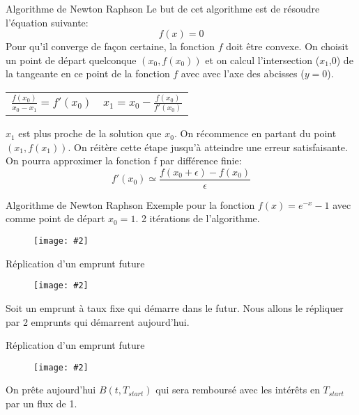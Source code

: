 \documentclass{beamer}
\newcommand{\FIG}[2]{\texttt{[image: \#2]}}
\begin{document}
\begin{frame}{Algorithme de Newton Raphson}
Le but de cet algorithme est de résoudre l'équation suivante:
\[
	f(x)=0
\]
Pour qu'il converge de façon certaine, la fonction $f$ doit être convexe.
On choisit un point de départ quelconque $(x_0,f(x_0))$ et on calcul l'intersection ($x_1$,0) de la tangeante en ce point de la fonction $f$ avec avec l'axe des abcisses ($y=0$).

\begin{center}
\begin{tabular}{c c}
$\frac{f(x_0)}{x_0-x_1}=f'(x_0)$
&
$x_1=x_0-\frac{f(x_0)}{f'(x_0)}$
\end{tabular}
\end{center}

$x_1$ est plus proche de la solution que $x_0$. On récommence en partant du point $(x_1,f(x_1))$. On réitère cette étape jusqu'à atteindre une erreur satisfaisante.\\
On pourra approximer la fonction f par différence finie:
\[
f'(x_0) \simeq \frac{f(x_0+\epsilon)-f(x_0)}{\epsilon}
\]
\end{frame}

\begin{frame}{Algorithme de Newton Raphson}
Exemple pour la fonction $f(x)=e^{-x}-1$ avec comme point de départ $x_0=1$. 2 itérations de l'algorithme.
\begin{center}
\begin{figure}[h]
\FIG{4in}{figures/newtonraphson.png}
\end{figure}
\end{center}
\end{frame}

\begin{frame}{Réplication d'un emprunt future}
\begin{center}
\begin{figure}[h]
\FIG{4in}{figures/fwd_replic1.png}
\end{figure}
\end{center}
Soit un emprunt à taux fixe qui démarre dans le futur. Nous allons le répliquer par 2 emprunts qui démarrent aujourd'hui.
\end{frame}

\begin{frame}{Réplication d'un emprunt future}
\begin{center}
\begin{figure}[h]
\FIG{4in}{figures/fwd_replic2.png}
\end{figure}
\end{center}
On prête aujourd'hui $B(t,T_{start})$ qui sera remboursé avec les intérêts en $T_{start}$ par un flux de 1.
\end{frame}
\end{document}
